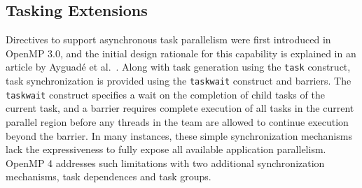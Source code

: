 \subsection{Tasking Extensions}
\label{sub:tasking}



Directives to support asynchronous task parallelism were first introduced in OpenMP 3.0, and the initial design rationale for this capability is explained in an article by Ayguad\'{e} et al.~\cite{ayguade2009tpds}.  Along with task generation using the \texttt{task} construct, task synchronization is provided using the \texttt{taskwait} construct and barriers.  The \texttt{taskwait} construct specifies a wait on the completion of child tasks of the current task, and a barrier requires complete execution of all tasks in the current parallel region before any threads in the team are allowed to continue execution beyond the barrier.  In many instances, these simple synchronization mechanisms lack the expressiveness to fully expose all available application parallelism.  OpenMP 4 addresses such limitations with two additional synchronization mechanisms, task dependences and task groups.



